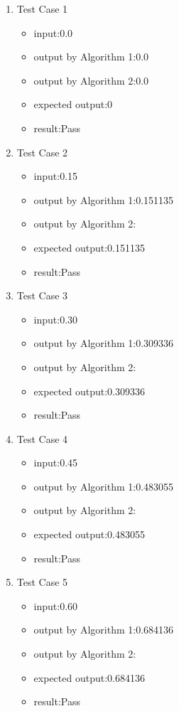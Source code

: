 \documentclass[10pt,a4paper,twoside]{article}
\begin{document}
\begin{enumerate}
\item 
Test Case 1
\begin{itemize}
    \item input:0.0
    \item output by Algorithm 1:0.0
    \item output by Algorithm 2:0.0
    \item expected output:0
    \item result:Pass
\end{itemize}
\item 
Test Case 2
\begin{itemize}
    \item input:0.15
    \item output by Algorithm 1:0.151135
    \item output by Algorithm 2:
    \item expected output:0.151135
    \item result:Pass
\end{itemize}
\item 
Test Case 3
\begin{itemize}
    \item input:0.30
    \item output by Algorithm 1:0.309336
    \item output by Algorithm 2:
    \item expected output:0.309336
    \item result:Pass
\end{itemize}
\item 
Test Case 4
\begin{itemize}
    \item input:0.45
    \item output by Algorithm 1:0.483055
    \item output by Algorithm 2:
    \item expected output:0.483055
    \item result:Pass
\end{itemize}
\item 
Test Case 5
\begin{itemize}
    \item input:0.60
    \item output by Algorithm 1:0.684136
    \item output by Algorithm 2:
    \item expected output:0.684136
    \item result:Pass
\end{itemize}

\end{enumerate}
\end{document}
